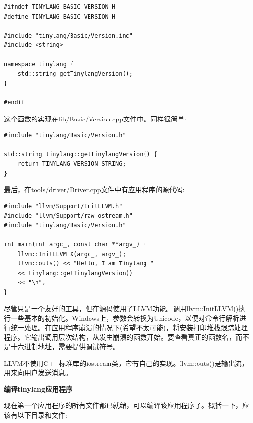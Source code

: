 \begin{lstlisting}[caption={}]
#ifndef TINYLANG_BASIC_VERSION_H
#define TINYLANG_BASIC_VERSION_H

#include "tinylang/Basic/Version.inc"
#include <string>

namespace tinylang {
	std::string getTinylangVersion();
}

#endif
\end{lstlisting}

这个函数的实现在lib/Basic/Version.cpp文件中。同样很简单:\par

\begin{lstlisting}[caption={}]
#include "tinylang/Basic/Version.h"

std::string tinylang::getTinylangVersion() {
	return TINYLANG_VERSION_STRING;
}
\end{lstlisting}

最后，在tools/driver/Driver.cpp文件中有应用程序的源代码:\par

\begin{lstlisting}[caption={}]
#include "llvm/Support/InitLLVM.h"
#include "llvm/Support/raw_ostream.h"
#include "tinylang/Basic/Version.h"

int main(int argc_, const char **argv_) {
	llvm::InitLLVM X(argc_, argv_);
	llvm::outs() << "Hello, I am Tinylang "
	<< tinylang::getTinylangVersion()
	<< "\n";
}
\end{lstlisting}

尽管只是一个友好的工具，但在源码使用了LLVM功能。调用llvm::InitLLVM()执行一些基本的初始化。Windows上，参数会转换为Unicode，以便对命令行解析进行统一处理。在应用程序崩溃的情况下(希望不太可能)，将安装打印堆栈跟踪处理程序。它输出调用层次结构，从发生崩溃的函数开始。要查看真正的函数名，而不是十六进制地址，需要提供调试符号。\par

LLVM不使用C++标准库的iostream类，它有自己的实现。llvm::outs()是输出流，用来向用户发送消息。\par

\hspace*{\fill} \par %
\textbf{编译tinylang应用程序}

现在第一个应用程序的所有文件都已就绪，可以编译该应用程序了。概括一下，应该有以下目录和文件:\par


